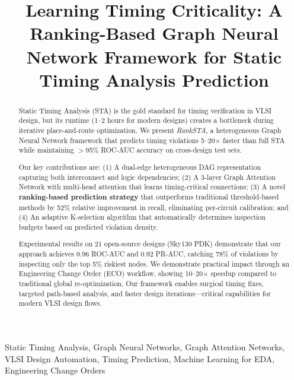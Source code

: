 \documentclass[10pt,twocolumn,journal]{IEEEtran}
\begin{document}
\title{Learning Timing Criticality: A Ranking-Based Graph Neural Network Framework for Static Timing Analysis Prediction}

\author{
}

\maketitle

\begin{abstract}
Static Timing Analysis (STA) is the gold standard for timing verification in VLSI design, but its runtime (1--2 hours for modern designs) creates a bottleneck during iterative place-and-route optimization. We present \textit{RankSTA}, a heterogeneous Graph Neural Network framework that predicts timing violations 5--20$\times$ faster than full STA while maintaining $>$95\% ROC-AUC accuracy on cross-design test sets.

Our key contributions are: (1) A dual-edge heterogeneous DAG representation capturing both interconnect and logic dependencies; (2) A 3-layer Graph Attention Network with multi-head attention that learns timing-critical connections; (3) A novel \textbf{ranking-based prediction strategy} that outperforms traditional threshold-based methods by 52\% relative improvement in recall, eliminating per-circuit calibration; and (4) An adaptive K-selection algorithm that automatically determines inspection budgets based on predicted violation density.

Experimental results on 21 open-source designs (Sky130 PDK) demonstrate that our approach achieves 0.96 ROC-AUC and 0.92 PR-AUC, catching 78\% of violations by inspecting only the top 5\% riskiest nodes. We demonstrate practical impact through an Engineering Change Order (ECO) workflow, showing 10--20$\times$ speedup compared to traditional global re-optimization. Our framework enables surgical timing fixes, targeted path-based analysis, and faster design iterations---critical capabilities for modern VLSI design flows.
\end{abstract}

\begin{IEEEkeywords}
Static Timing Analysis, Graph Neural Networks, Graph Attention Networks, VLSI Design Automation, Timing Prediction, Machine Learning for EDA, Engineering Change Orders
\end{IEEEkeywords}
\end{document}
